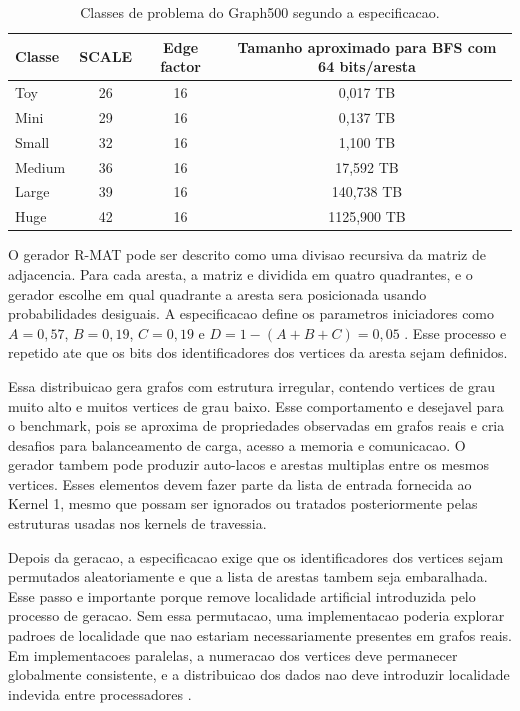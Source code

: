 \begin{table}[H]
\centering
\begin{tabular}{l|c|c|c}
Classe & SCALE & Edge factor & Tamanho aproximado para BFS com 64 bits/aresta \\
\hline
Toy & 26 & 16 & 0,017 TB \\
Mini & 29 & 16 & 0,137 TB \\
Small & 32 & 16 & 1,100 TB \\
Medium & 36 & 16 & 17,592 TB \\
Large & 39 & 16 & 140,738 TB \\
Huge & 42 & 16 & 1125,900 TB \\
\end{tabular}
\caption{Classes de problema do Graph500 segundo a especificacao.}
\label{tab:graph500-classes}
\end{table}

O gerador R-MAT pode ser descrito como uma divisao recursiva da matriz de
adjacencia. Para cada aresta, a matriz e dividida em quatro quadrantes, e o
gerador escolhe em qual quadrante a aresta sera posicionada usando probabilidades
desiguais. A especificacao define os parametros iniciadores como
$A = 0{,}57$, $B = 0{,}19$, $C = 0{,}19$ e
$D = 1 - (A+B+C) = 0{,}05$ \cite{graph500spec}. Esse processo e repetido ate que
os bits dos identificadores dos vertices da aresta sejam definidos.

Essa distribuicao gera grafos com estrutura irregular, contendo vertices de grau
muito alto e muitos vertices de grau baixo. Esse comportamento e desejavel para o
benchmark, pois se aproxima de propriedades observadas em grafos reais e cria
desafios para balanceamento de carga, acesso a memoria e comunicacao. O gerador
tambem pode produzir auto-lacos e arestas multiplas entre os mesmos vertices.
Esses elementos devem fazer parte da lista de entrada fornecida ao Kernel 1,
mesmo que possam ser ignorados ou tratados posteriormente pelas estruturas usadas
nos kernels de travessia.

Depois da geracao, a especificacao exige que os identificadores dos vertices
sejam permutados aleatoriamente e que a lista de arestas tambem seja embaralhada.
Esse passo e importante porque remove localidade artificial introduzida pelo
processo de geracao. Sem essa permutacao, uma implementacao poderia explorar
padroes de localidade que nao estariam necessariamente presentes em grafos reais.
Em implementacoes paralelas, a numeracao dos vertices deve permanecer globalmente
consistente, e a distribuicao dos dados nao deve introduzir localidade indevida
entre processadores \cite{graph500spec}.


